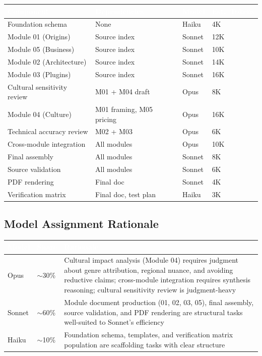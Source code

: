 \documentclass[11pt,letterpaper]{article}
\newcommand{\tableheader}[1]{\textbf{\sffamily\textcolor{white}{#1}}}
\begin{document}
\begin{center}
\begin{tabularx}{\textwidth}{L{3cm}L{3cm}C{2cm}C{2cm}}
\toprule
{}
\tableheader{Component} & \tableheader{Dependencies} & \tableheader{Model} & \tableheader{Est.\ Tokens} \\
\midrule
Foundation schema & None & Haiku & 4K \\
Module 01 (Origins) & Source index & Sonnet & 12K \\
Module 05 (Business) & Source index & Sonnet & 10K \\
Module 02 (Architecture) & Source index & Sonnet & 14K \\
Module 03 (Plugins) & Source index & Sonnet & 16K \\
Cultural sensitivity review & M01 + M04 draft & Opus & 8K \\
Module 04 (Culture) & M01 framing, M05 pricing & Opus & 16K \\
Technical accuracy review & M02 + M03 & Opus & 6K \\
Cross-module integration & All modules & Opus & 10K \\
Final assembly & All modules & Sonnet & 8K \\
Source validation & All modules & Sonnet & 6K \\
PDF rendering & Final doc & Sonnet & 4K \\
Verification matrix & Final doc, test plan & Haiku & 3K \\
\bottomrule
\end{tabularx}
\end{center}

\subsection{Model Assignment Rationale}

\begin{center}
\begin{tabularx}{\textwidth}{L{2.5cm}L{3cm}X}
\toprule
{}
\tableheader{Model} & \tableheader{Share} & \tableheader{Rationale} \\
\midrule
Opus & $\sim$30\% & Cultural impact analysis (Module 04) requires judgment about genre attribution, regional nuance, and avoiding reductive claims; cross-module integration requires synthesis reasoning; cultural sensitivity review is judgment-heavy \\
Sonnet & $\sim$60\% & Module document production (01, 02, 03, 05), final assembly, source validation, and PDF rendering are structural tasks well-suited to Sonnet's efficiency \\
Haiku & $\sim$10\% & Foundation schema, templates, and verification matrix population are scaffolding tasks with clear structure \\
\bottomrule
\end{tabularx}
\end{center}
\end{document}
